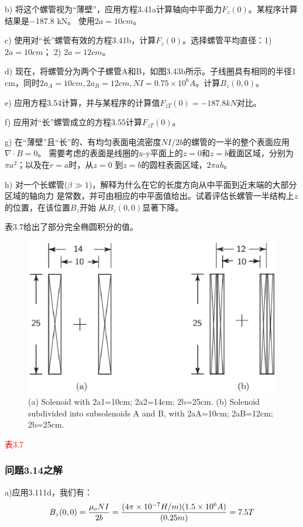 b) 将这个螺管视为“薄壁”，应用方程3.41a计算轴向中平面力$F_z(0)$。某程序计算结果是−187.8 kN。
使用$2a=10 cm$。

c) 使用对“长”螺管有效的方程3.41b，计算$F_z(0)$。选择螺管平均直径：1) $2a =10 cm$； 2) $2a=12 cm$。

d) 现在，将螺管分为两个子螺管A和B，如图3.43b所示。子线圈具有相同的半径1 cm，同时$2a_A=10 cm, 2a_B=12 cm,
NI =0.75\times10^6 A$。计算$B_z(0, 0)$。

e) 应用方程3.54计算，并与某程序的计算值$F_{zT}(0)=−187.8 kN$对比。

f) 应用对“长”螺管成立的方程3.55计算$F_{zT}(0)$。

g) 在“薄壁”且“长”的、有均匀表面电流密度$NI/2b$的螺管的一半的整个表面应用$\nabla\cdot B=0$。
需要考虑的表面是线圈的x-y平面上的$z=0$和$z=b$截面区域，分别为$\pi a^2$；以及在$r=a$时，从$z=0$
到$z=b$的圆柱表面区域，$2\pi ab$。

h) 对一个长螺管($\beta\gg 1$)，解释为什么在它的长度方向从中平面到近末端的大部分区域的轴向力
是常数，并可由相应的中平面值给出。试着评估长螺管一半结构上$z$的位置，在该位置$B_z$开始
从$B_z(0,0)$显著下降。

表3.7给出了部分完全椭圆积分的值。
\begin{figure}[htbp]
	\centering
	\includegraphics[scale=0.5]{chpt3/figs/fig3.43.eps}
	\caption{(a) Solenoid with 2a1=10cm; 2a2=14cm; 2b=25cm. (b) Solenoid subdivided
		into subsolenoids A and B, with 2aA=10cm; 2aB=12cm; 2b=25cm.}
\end{figure}
\textcolor{red}{表3.7}

\subsubsection{问题3.14之解}
a)应用3.111d，我们有：
\begin{equation}
B_{z}(0,0)=\frac{\mu_{o}NI}{2b}\\%
=\frac{(4\pi\times10^{-7}H/m)(1.5\times10^{6}A)}{(0.25m)}=7.5T\\
\end{equation}

